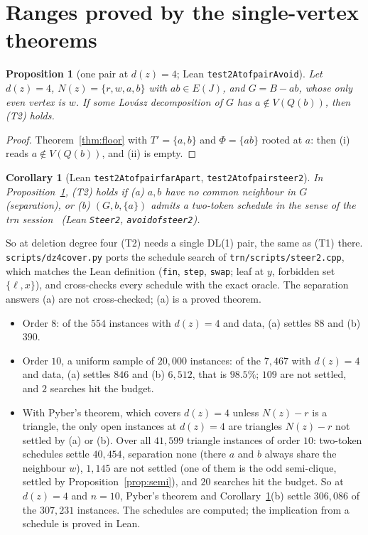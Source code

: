 \documentclass[11pt]{amsart}
\newtheorem{proposition}[theorem]{Proposition}
\newtheorem{corollary}[theorem]{Corollary}
\theoremstyle{definition}
\theoremstyle{remark}
\renewcommand{\_}{\oldunderscore\allowbreak}
\newcommand{\TRIDATA}{two-token schedules settle $40{,}454$, separation none (there $a$ and $b$ always share the neighbour $w$), $1{,}145$ are not settled (one of them is the odd semi-clique, settled by Proposition~\ref{prop:semi}), and $20$ searches hit the budget. So at $d(z)=4$ and $n=10$, Pyber's theorem and Corollary~\ref{cor:pair}(b) settle $306{,}086$ of the $307{,}231$ instances. The schedules are computed; the implication from a schedule is proved in Lean}
\begin{document}
\section{Ranges proved by the single-vertex theorems}\label{sec:range}

\begin{proposition}[one pair at $d(z)=4$; Lean \texttt{test2At\_of\_pairAvoid}]\label{prop:pair}
Let $d(z)=4$, $N(z)=\{r,w,a,b\}$ with $ab\in E(J)$, and $G=B-ab$, whose only even vertex is $w$. If some
Lov\'asz decomposition of $G$ has $a\notin V(Q(b))$, then (T2) holds.
\end{proposition}

\begin{proof}
Theorem~\ref{thm:floor} with $T'=\{a,b\}$ and $\Phi=\{ab\}$ rooted at $a$: then (i) reads
$a\notin V(Q(b))$, and (ii) is empty.
\end{proof}

\begin{corollary}[Lean \texttt{test2At\_of\_pair\_farApart}, \texttt{test2At\_of\_pair\_steer2}]\label{cor:pair}
In Proposition~\ref{prop:pair}, (T2) holds if (a) $a,b$ have no common neighbour in $G$ (separation), or
(b) $(G,b,\{a\})$ admits a two-token schedule in the sense of the trn session~\cite{TRN} (Lean \texttt{Steer2},
\texttt{avoid\_of\_steer2}).
\end{corollary}

So at deletion degree four (T2) needs a single DL(1) pair, the same as (T1) there.
\texttt{scripts/dz4\_cover.py} ports the schedule search of \texttt{trn/scripts/steer2.cpp}, which
matches the Lean definition (\texttt{fin}, \texttt{step}, \texttt{swap}; leaf at $y$, forbidden set
$\{\ell,x\}$), and cross-checks every schedule with the exact oracle. The separation answers (a)
are not cross-checked; (a) is a proved theorem.
\begin{itemize}[leftmargin=*]
\item Order $8$: of the $554$ instances with $d(z)=4$ and data, (a) settles $88$ and (b) $390$.
\item Order $10$, a uniform sample of $20{,}000$ instances: of the $7{,}467$ with $d(z)=4$ and data,
(a) settles $846$ and (b) $6{,}512$, that is $98.5\%$; $109$ are not settled, and $2$ searches hit
the budget.
\item With Pyber's theorem, which covers $d(z)=4$ unless $N(z)-r$ is a triangle, the only open
instances at $d(z)=4$ are triangles $N(z)-r$ not settled by (a) or (b). Over all $41{,}599$ triangle
instances of order $10$: \TRIDATA.
\end{itemize}
\end{document}

